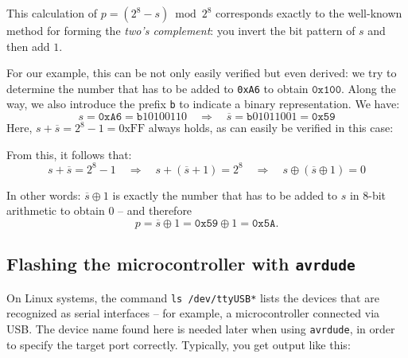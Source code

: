 \documentclass[a4paper,12pt]{article}
\begin{document}
\begin{enumerate}
	This calculation of $p = (2^8 - s) \bmod 2^8$ corresponds exactly to
	the well-known method for forming the \emph{two's complement}: you
	invert the bit pattern of $s$ and then add $1$.

	For our example, this can be not only easily verified but even
	derived: we try to determine the number that has to be added to
	\texttt{0xA6} to obtain $\texttt{0x100}$.
	Along the way, we also introduce the prefix \texttt{b} to indicate a
	binary representation. We have:
	\[
	    s = \texttt{0xA6} = \texttt{b}10100110
	    \quad\Rightarrow\quad
	    \overline{s} = \texttt{b}01011001 = \texttt{0x59}
	\]
	Here, $s + \overline{s} = 2^8 - 1 = \text{0xFF}$ always holds, as can
	easily be verified in this case:
	\vspace{-0.2cm}
	\begin{center}
	\end{center}

	From this, it follows that:
	\[
	    s + \overline{s} = 2^8 - 1
	    \quad\Rightarrow\quad
	    s + (\overline{s} + 1) = 2^8
	    \quad\Rightarrow\quad
	    s \oplus (\overline{s} \oplus 1) = 0
	\]

	In other words: $\overline{s} \oplus 1$ is exactly the number that has
	to be added to $s$ in 8-bit arithmetic to obtain $0$ – and therefore
	\[
	    p = \overline{s} \oplus 1 = \texttt{0x59} \oplus 1 = \texttt{0x5A}.
	\]

\end{enumerate}


\newpage
\subsection{Flashing the microcontroller with \texttt{avrdude}}
\label{sec:avrdude}

On Linux systems, the command \texttt{ls /dev/ttyUSB*} lists the devices that
are recognized as serial interfaces – for example, a microcontroller
connected via USB. The device name found here is needed later when using
\texttt{avrdude}, in order to specify the target port correctly.
Typically, you get output like this:
\end{document}
